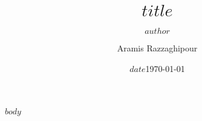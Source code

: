 \documentclass{beamer}
\title{$title$}
\author{$author$}
\author{Aramis Razzaghipour}
\date{$date$}
\date{\today}
\institute{$institute$}
\institute{MSC}
\begin{document}
\maketitle

$body$
\end{document}
